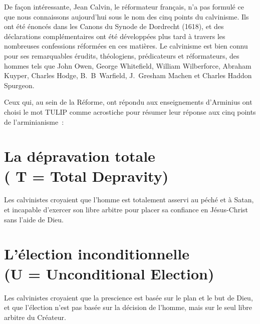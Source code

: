
\digestpagebreak
\pocketpagebreak
\begin{digestpar}{}
\begin{pocketpar}{}
De façon intéressante, Jean Calvin, le réformateur français, n'a pas formulé
 ce que nous con\-naissons au\-jour\-d'hui sous le nom des cinq points du calvinisme.
 Ils ont été énoncés dans les Canons du Synode de Dordrecht (1618), et des déclarations
 complémentaires ont été développées plus tard à travers les nombreuses
 confessions réformées en ces matières. Le calvinisme est bien connu
 pour 
 ses remarquables érudits, théologiens, prédicateurs et réformateurs,
 des hommes tels que John Owen, George Whitefield,
 William Wilberforce, Abraham Kuyper, Charles Hodge,
 B.~B~Warfield, J.~Gresham Machen et
 Charles Haddon Spurgeon.
\end{pocketpar}
\end{digestpar}

Ceux qui, au sein de la Réforme, ont répondu aux enseignements d'Arminius
 ont choisi le mot \Og \mbox{TULIP} \Fg{} comme acrostiche pour résumer
 leur réponse aux cinq points de l'arminianisme~:

\nobreak

\newcommand*{\sectitle}[1]{%
   \normalsize(#1)}
\newcommand*{\secwithtitle}[2]{%
   \section*{#1\\\sectitle{#2}}}

\secwithtitle{La dépravation totale}{ T = Total Depravity}

Les calvinistes croyaient que l'hom\-me est totalement 
 asservi au péché  et à Satan,
 et incapable d'exercer son libre arbitre 
 pour placer sa confiance en Jésus-Christ sans l'aide de Dieu.

\secwithtitle{L'élection inconditionnelle}{U = Unconditional Election}

Les calvinistes croyaient que la prescience
 est basée sur le plan et le but de Dieu, et que l'élection
 n'est pas basée sur la décision de l'hom\-me, mais sur le seul \Og libre arbitre \Fg{}
 du Créateur.

